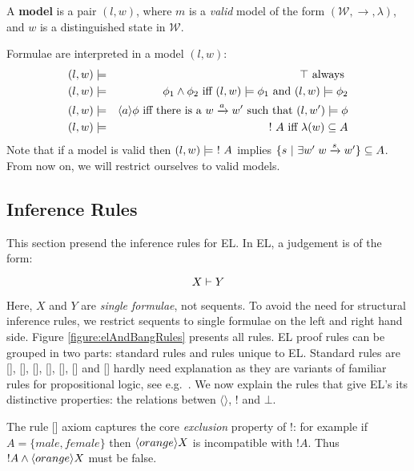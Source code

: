 \begin{definition}
A {\bf  model} is a pair $(l,w)$, where $m$ is a \emph{valid} model of the form $(\mathcal{W}, \rightarrow, \lambda)$, and $w$ is a distinguished state in $\mathcal{W}$.
\end{definition}
Formulae are interpreted in a  model $(l,w)$:
\begin{eqnarray}
(l,w) & \models & \top  \mbox{ always } \nonumber \\
(l,w) & \models & \phi_1 \land \phi_2 \mbox{ iff } (l,w)  \models \phi_1 \mbox { and } (l,w) \models \phi_2 \nonumber \\
(l,w) & \models & \langle a \rangle \phi \mbox{ iff there is a } w \xrightarrow{a} w' \mbox { such that } (l,w') \models \phi \nonumber \\
(l,w) & \models & \ ! \  A \mbox{ iff } \lambda(w) \subseteq A\nonumber
\end{eqnarray}
Note that if a model is valid then $(l,w) \models \ ! \  A$ implies $\{s \ | \  \exists w' \; w \xrightarrow{s} w'\} \subseteq A$.
From now on, we will restrict ourselves to valid models.






\subsection{Inference Rules}

This section presend the inference rules for EL.
In EL, a judgement is of the form:

\[
  X \vdash Y
\]

\NI Here, $X$ and $Y$ are \emph{single formulae}, not sequents.  To
avoid the need for structural inference rules, we restrict sequents to
single formulae on the left and right hand side. Figure
\ref{figure:elAndBangRules} presents all rules.  EL proof rules can be
grouped in two parts: standard rules and rules unique to EL.  Standard
rules are [], [],
[], [],
[], [] and
[] hardly need explanation as they are variants
of familiar rules for propositional logic, see
e.g.~\cite{TroelstraAS:basprot,vanDalenD:logstr}.  We now explain the
rules that give EL's its distinctive properties: the relations betwen
$\langle \rangle$, $!$ and $\bot$.

The rule [] axiom captures the core
\emph{exclusion} property of !: for example if $A = \{male, female\}$
then $\langle orange \rangle X$ is incompatible with $!A$. Thus $!A \land
\langle orange \rangle X$ must be false.

